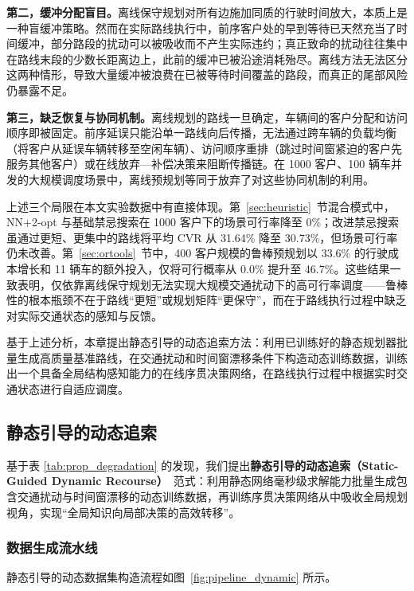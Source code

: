 \documentclass[12pt,a4paper,UTF8]{article}
\begin{document}
\textbf{第二，缓冲分配盲目。}离线保守规划对所有边施加同质的行驶时间放大，本质上是一种盲缓冲策略。然而在实际路线执行中，前序客户处的早到等待已天然充当了时间缓冲，部分路段的扰动可以被吸收而不产生实际违约；真正致命的扰动往往集中在路线末段的少数长距离边上，此前的缓冲已被沿途消耗殆尽。离线方法无法区分这两种情形，导致大量缓冲被浪费在已被等待时间覆盖的路段，而真正的尾部风险仍暴露不足。

\textbf{第三，缺乏恢复与协同机制。}离线规划的路线一旦确定，车辆间的客户分配和访问顺序即被固定。前序延误只能沿单一路线向后传播，无法通过跨车辆的负载均衡（将客户从延误车辆转移至空闲车辆）、访问顺序重排（跳过时间窗紧迫的客户先服务其他客户）或在线放弃—补偿决策来阻断传播链。在 1000 客户、100 辆车并发的大规模调度场景中，离线预规划等同于放弃了对这些协同机制的利用。

上述三个局限在本文实验数据中有直接体现。第~\ref{sec:heuristic}~节混合模式中，NN+2-opt 与基础禁忌搜索在 1000 客户下的场景可行率降至 0\%；改进禁忌搜索虽通过更短、更集中的路线将平均 CVR 从 31.64\% 降至 30.73\%，但场景可行率仍未改善。第~\ref{sec:ortools}~节中，400 客户规模的鲁棒预规划以 33.6\% 的行驶成本增长和 11 辆车的额外投入，仅将可行概率从 0.0\% 提升至 46.7\%。这些结果一致表明，仅依靠离线保守规划无法实现大规模交通扰动下的高可行率调度——鲁棒性的根本瓶颈不在于路线“更短”或规划矩阵“更保守”，而在于路线执行过程中缺乏对实际交通状态的感知与反馈。

基于上述分析，本章提出静态引导的动态追索方法：利用已训练好的静态规划器批量生成高质量基准路线，在交通扰动和时间窗漂移条件下构造动态训练数据，训练出一个具备全局结构感知能力的在线序贯决策网络，在路线执行过程中根据实时交通状态进行自适应调度。

\subsection{静态引导的动态追索}
\label{sec:dynamic_recourse}

基于表 \ref{tab:prop_degradation} 的发现，我们提出\textbf{静态引导的动态追索（Static-Guided Dynamic Recourse）}~\cite{joe2020deep,boffa2022deep}范式：利用静态网络毫秒级求解能力批量生成包含交通扰动与时间窗漂移的动态训练数据，再训练序贯决策网络从中吸收全局规划视角，实现“全局知识向局部决策的高效转移”。

\subsubsection{数据生成流水线}

静态引导的动态数据集构造流程如图~\ref{fig:pipeline_dynamic} 所示。
\end{document}
